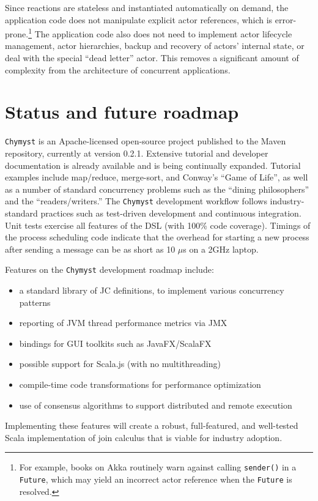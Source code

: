 \documentclass[sigplan,10pt]{acmart}\settopmatter{}
\begin{document}
Since reactions are stateless and instantiated automatically
on demand, the application code does not manipulate explicit actor
references, which is error-prone.\footnote{ For example, books on Akka routinely warn against calling \texttt{sender()}
in a \texttt{Future}, which may yield an incorrect actor reference
when the \texttt{Future} is resolved.} The application code also does not need to implement actor lifecycle
management, actor hierarchies, backup and recovery of actors' internal
state, or deal with the special ``dead letter'' actor. This removes
a significant amount of complexity from the architecture of concurrent
applications.

\section{Status and future roadmap}

\texttt{Chymyst} is an Apache-licensed open-source project published
to the Maven repository, currently at version 0.2.1. Extensive tutorial
and developer documentation is already available and is being continually
expanded. Tutorial examples include map/reduce, merge-sort, and Conway's
``Game of Life'', as well as a number of standard concurrency problems
such as the ``dining philosophers'' and the ``readers/writers.''
The \texttt{Chymyst} development workflow follows industry-standard
practices such as test-driven development and continuous integration.
Unit tests exercise all features of the DSL (with 100\% code coverage).
Timings of the process scheduling code indicate that the overhead
for starting a new process after sending a message can be as short
as 10 $\mu$s on a 2GHz laptop. 

Features on the \texttt{Chymyst} development roadmap include:
\begin{itemize}
\item a standard library of JC definitions, to implement various concurrency
patterns
\item reporting of JVM thread performance metrics via JMX
\item bindings for GUI toolkits such as JavaFX/ScalaFX
\item possible support for Scala.js (with no multithreading)
\item compile-time code transformations for performance optimization
\item use of consensus algorithms to support distributed and remote execution
\end{itemize}
Implementing these features will create a robust, full-featured, and
well-tested Scala implementation of join calculus that is viable for
industry adoption.
\end{document}
